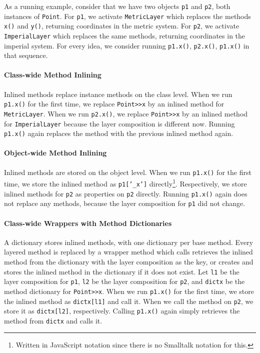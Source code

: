 \documentclass[english,paper=a4,twocolumn=true,DIV=calc,fontsize=9pt]{scrartcl}
\begin{document}
As a running example, consider that we have two objects \texttt{p1} and \texttt{p2}, both instances of \texttt{Point}. For \texttt{p1}, we activate \texttt{MetricLayer} which replaces the methods \texttt{x()} and \texttt{y()}, returning coordinates in the metric system. For \texttt{p2}, we activate \texttt{ImperialLayer} which replaces the same methods, returning coordinates in the imperial system. For every idea, we consider running \texttt{p1.x()}, \texttt{p2.x()}, \texttt{p1.x()} in that sequence.

\paragraph{Class-wide Method Inlining}
Inlined methods replace instance methods on the class level. When we run \texttt{p1.x()} for the first time, we replace \texttt{Point>>x} by an inlined method for \texttt{MetricLayer}. When we run \texttt{p2.x()}, we replace \texttt{Point>>x} by an inlined method for \texttt{ImperialLayer} because the layer composition is different now. Running \texttt{p1.x()} again replaces the method with the previous inlined method again.

\paragraph{Object-wide Method Inlining}
Inlined methods are stored on the object level. When we run \texttt{p1.x()} for the first time, we store the inlined method as \texttt{p1['\_x']} directly\footnote{Written in JavaScript notation since there is no Smalltalk notation for this.}. Respectively, we store inlined methods for \texttt{p2} as properties on \texttt{p2} directly. Running \texttt{p1.x()} again does not replace any methods, because the layer composition for \texttt{p1} did not change.

\paragraph{Class-wide Wrappers with Method Dictionaries}
A dictionary stores inlined methods, with one dictionary per base method. Every layered method is replaced by a wrapper method which calls retrieves the inlined method from the dictionary with the layer composition as the key, or creates and stores the inlined method in the dictionary if it does not exist. Let \texttt{l1} be the layer composition for \texttt{p1}, \texttt{l2} be the layer composition for \texttt{p2}, and \texttt{dictx} be the method dictionary for \texttt{Point>>x}. When we run \texttt{p1.x()} for the first time, we store the inlined method as \texttt{dictx[l1]} and call it. When we call the method on \texttt{p2}, we store it as \texttt{dictx[l2]}, respectively. Calling \texttt{p1.x()} again simply retrieves the method from \texttt{dictx} and calls it.
\end{document}
